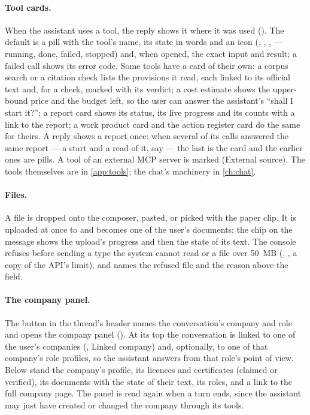 \paragraph{Tool cards.} When the assistant uses a tool, the reply shows it where it was
used (). The default is a pill with the tool's name, its state in
words and an icon (, , ,  --- running, done,
failed, stopped) and, when opened, the exact input and result; a failed call shows its error
code. Some tools have a card of their own: a corpus search or a citation check lists the
provisions it read, each linked to its official text and, for a check, marked with its verdict;
a cost estimate shows the upper-bound price and the budget left, so the user can answer the
assistant's \enquote{shall I start it?}; a report card shows its status, its live progress and
its counts with a link to the report; a work product card and the action register card do the
same for theirs. A reply shows a report once: when several of its calls answered the same
report --- a start and a read of it, say --- the last is the card and the earlier ones are
pills. A tool of an external MCP server is marked  (External
source). The tools themselves are in \cref{app:tools}; the chat's machinery in \cref{ch:chat}.

\paragraph{Files.} A file is dropped onto the composer, pasted, or picked with the paper clip.
It is uploaded at once to  and becomes one of the user's
documents; the chip on the message shows the upload's progress and then the state of its text.
The console refuses before sending a type the system cannot read or a file over 50~MB
(, , a copy of the API's limit), and names
the refused file and the reason above the field.

\paragraph{The company panel.} The button in the thread's header names the conversation's
company and role and opens the company panel (). At its top
the conversation is linked to one of the user's companies (, Linked company)
and, optionally, to one of that company's role profiles, so the assistant answers from that
role's point of view. Below stand the company's profile, its licences and certificates
(claimed or verified), its documents with the state of their text, its roles, and a link to the
full company page. The panel is read again when a turn ends, since the assistant may just have
created or changed the company through its tools.


